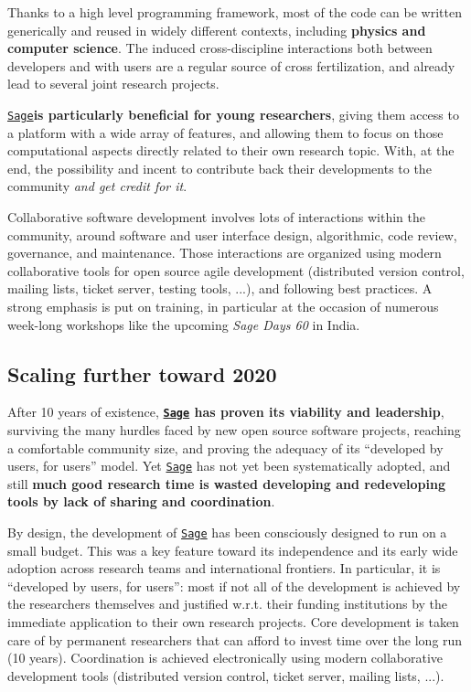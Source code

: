 \documentclass[a4,12pt]{amsart}
\newcommand{\sage}{\href{http://www.sagemath.org/}{\texttt{Sage}}\xspace}
\begin{document}
Thanks to a high level programming framework, most of the code can be
written generically and reused in widely different contexts, including
\textbf{physics and computer science}. The induced cross-discipline
interactions both between developers and with users
are a regular source of cross fertilization, and already lead to
several joint research projects.

\sage \textbf{is particularly beneficial for young researchers},
giving them access to a platform with a wide array of features, and
allowing them to focus on those computational aspects directly related
to their own research topic. With, at the end, the possibility and
incent to contribute back their developments to the community
\emph{and get credit for it}.

Collaborative software development involves lots of interactions
within the community, around software and user interface design,
algorithmic, code review, governance, and maintenance. Those
interactions are organized using modern collaborative tools for open
source agile development (distributed version control, mailing lists,
ticket server, testing tools, ...), and following best practices. A
strong emphasis is put on training, in particular at the occasion of
numerous week-long workshops like the upcoming \emph{Sage Days 60} in
India.

\subsection*{Scaling further toward 2020}

After 10 years of existence, \textbf{\sage has proven its viability
  and leadership}, surviving the many hurdles faced by new open source
software projects, reaching a comfortable community size, and proving
the adequacy of its ``developed by users, for users'' model.  Yet
\sage has not yet been systematically adopted, and still \textbf{much
  good research time is wasted developing and redeveloping tools by
  lack of sharing and coordination}.

By design, the development of \sage has been consciously designed to
run on a small budget. This was a key feature toward its independence
and its early wide adoption across research teams and international
frontiers. In particular, it is ``developed by users, for users'':
most if not all of the development is achieved by the researchers
themselves and justified w.r.t. their funding institutions by the
immediate application to their own research projects. Core development
is taken care of by permanent researchers that can afford to invest
time over the long run (10 years). Coordination is achieved
electronically using modern collaborative development tools
(distributed version control, ticket server, mailing lists, ...).
\end{document}
